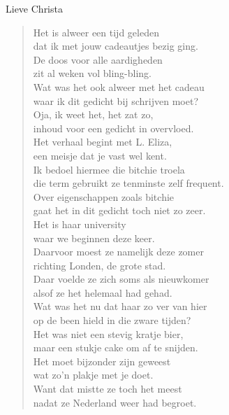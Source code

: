 \documentclass[12pt]{brief}
\date{3 september 2006}
\begin{document}
\begin{letter}{Lieve Christa}

\opening{}


\begin{verse}

Het is alweer een tijd geleden\\
dat ik met jouw cadeautjes bezig ging.\\
De doos voor alle aardigheden\\
zit al weken vol bling-bling.\\[1.5em]

Wat was het ook alweer met het cadeau\\
waar ik dit gedicht bij schrijven moet?\\
Oja, ik weet het, het zat zo,\\
inhoud voor een gedicht in overvloed.\\[1.5em]

Het verhaal begint met L. Eliza,\\
een meisje dat je vast wel kent.\\
Ik bedoel hiermee die bitchie troela\\
die term gebruikt ze tenminste zelf frequent.\\[1.5em]

Over eigenschappen zoals bitchie\\
gaat het in dit gedicht toch niet zo zeer.\\
Het is haar university\\
waar we beginnen deze keer.\\[1.5em]

Daarvoor moest ze namelijk deze zomer\\
richting Londen, de grote stad.\\
Daar voelde ze zich soms als nieuwkomer\\
alsof ze het helemaal had gehad.\\[1.5em]

Wat was het nu dat haar zo ver van hier\\
op de been hield in die zware tijden?\\
Het was niet een stevig kratje bier,\\
maar een stukje cake om af te snijden.\\[1.5em]

Het moet bijzonder zijn geweest\\
wat zo'n plakje met je doet.\\
Want dat mistte ze toch het meest\\
nadat ze Nederland weer had begroet.\\[1.5em]


\end{verse}
\end{letter}
\end{document}
